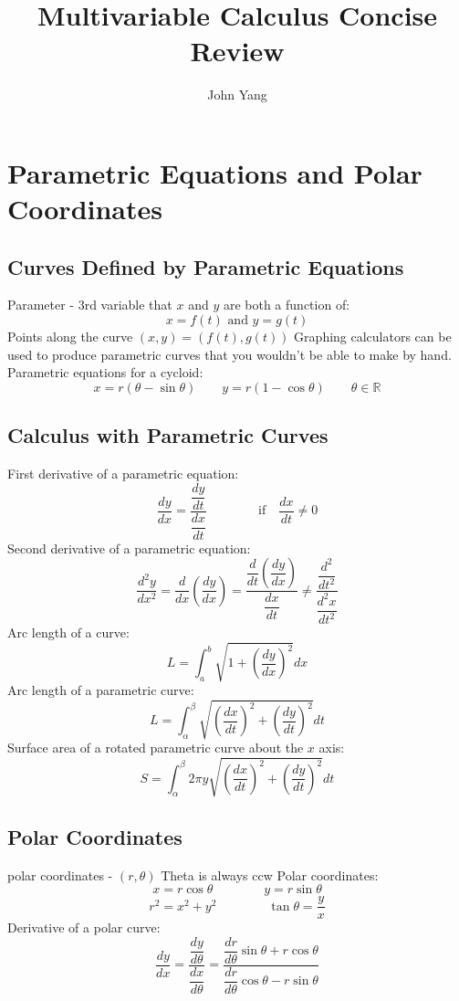 \documentclass{article}
\title{Multivariable Calculus Concise Review} %
\author{John Yang}
\begin{document}
    \maketitle
    \tableofcontents\newpage
    
    \section{Parametric Equations and Polar Coordinates} %
    
    \subsection{Curves Defined by Parametric Equations} %
    \begin{outline}
        \1 Parameter - 3rd variable that $x$ and $y$ are both a function of: \[x=f(t)\text{ and }y=g(t)\]
        \1 Points along the curve \((x,y)=(f(t),g(t))\)
        \1 Graphing calculators can be used to produce parametric curves that you wouldn't be able to make by hand. 
        \1 Parametric equations for a cycloid: \[x=r(\theta-\sin\theta) \qquad y=r(1-\cos\theta) \qquad \theta\in\mathbb{R}\]
    \end{outline}
    \subsection{Calculus with Parametric Curves}
    \begin{outline}
        \1 First derivative of a parametric equation: \[\dfrac{dy}{dx}=\dfrac{\dfrac{dy}{dt}}{\dfrac{dx}{dt}}\qquad\qquad\text{if}\quad\dfrac{dx}{dt}\neq0\]
        \1 Second derivative of a parametric equation: \[\dfrac{d^2y}{dx^2}=\dfrac{d}{dx}\left(\dfrac{dy}{dx}\right)=\dfrac{\dfrac{d}{dt}\left(\dfrac{dy}{dx}\right)}{\dfrac{dx}{dt}}\neq\dfrac{\dfrac{d^2}{dt^2}}{\dfrac{d^2x}{dt^2}}\]
        \1 Arc length of a curve: \[L=\int^b_a\sqrt{1+\left(\dfrac{dy}{dx}\right)^2}dx\]
        \1 Arc length of a parametric curve: \[L=\int^\beta_\alpha\sqrt{\left(\dfrac{dx}{dt}\right)^2+\left(\dfrac{dy}{dt}\right)^2}dt\]
        \1 Surface area of a rotated parametric curve about the $x$ axis: \[S=\int^\beta_\alpha2\pi y\sqrt{\left(\dfrac{dx}{dt}\right)^2+\left(\dfrac{dy}{dt}\right)^2}dt\]

    \end{outline}
    \subsection{Polar Coordinates}
    \begin{outline}
        \1 polar coordinates - \((r,\theta)\)
        \1 Theta is always ccw 
        \1 Polar coordinates: \[x=r\cos\theta\qquad\qquad y=r\sin\theta\]\[r^2=x^2+y^2\qquad\qquad\tan\theta=\dfrac{y}{x}\]
        \1 Derivative of a polar curve: \[\dfrac{dy}{dx}=\dfrac{\dfrac{dy}{d\theta}}{\dfrac{dx}{d\theta}}=\dfrac{\dfrac{dr}{d\theta}\sin\theta+r\cos\theta}{\dfrac{dr}{d\theta}\cos\theta-r\sin\theta}\]
    \end{outline}
\end{document}
